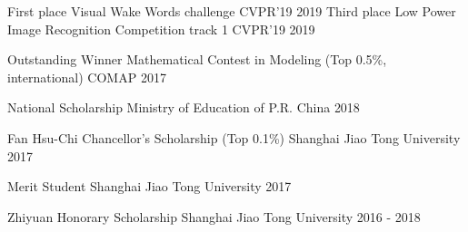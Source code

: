 
\begin{cvhonors}
\cvhonor
{First place}
{Visual Wake Words challenge}
{CVPR'19}
{2019}
\cvhonor
{Third place}
{Low Power Image Recognition Competition track 1}
{CVPR'19}
{2019}

\cvhonor
{Outstanding Winner}
{Mathematical Contest in Modeling (Top 0.5\%, international)}
{COMAP}
{2017}

\cvhonor
{National Scholarship}
{}
{Ministry of Education of P.R. China}
{2018}

\cvhonor
{Fan Hsu-Chi Chancellor's Scholarship}
{(Top 0.1\%)}
{Shanghai Jiao Tong University}
{2017}

\cvhonor
{Merit Student}
{}
{Shanghai Jiao Tong University}
{2017}

\cvhonor
{Zhiyuan Honorary Scholarship}
{}
{Shanghai Jiao Tong University}
{2016 - 2018}
\end{cvhonors}
